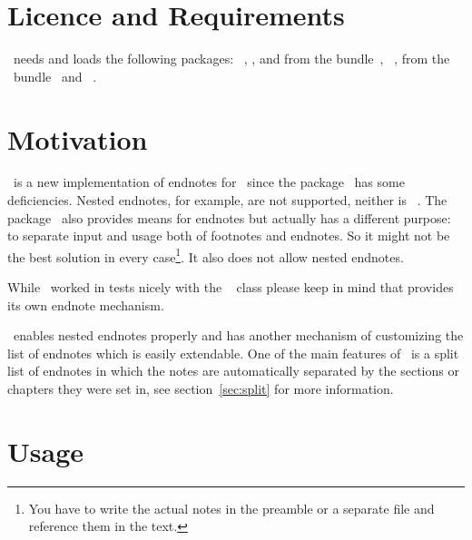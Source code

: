 \documentclass[load-preamble+]{cnltx-doc}
\begin{document}
\section{Licence and Requirements}
\license

\enotez\ needs and loads the following packages:
~\cite{bnd:l3kernel}, ,  and
 from the  bundle~\cite{bnd:l3packages},
~\cite{pkg:xpatch},  from the \KOMAScript\
bundle~\cite{bnd:koma-script} and ~\cite{pkg:translations}.

\section{Motivation}
\enotez\ is a new implementation of endnotes for \LaTeXe\ since the
\pkg{endnotes} package~\cite{pkg:endnotes} has some deficiencies.  Nested
endnotes, for example, are not supported, neither is
~\cite{pkg:hyperref}.  The 
package~\cite{pkg:sepfootnotes} also provides means for endnotes but actually
has a different purpose: to separate input and usage both of footnotes and
endnotes.  So it might not be the best solution in every case\footnote{You
  have to write the actual notes in the preamble or a separate file and
  reference them in the text.}.  It also does not allow nested endnotes.

While \enotez\ worked in tests nicely with the
~\cite{cls:memoir} class please keep in mind that
\cls{memoir} provides its own endnote mechanism.

\enotez\ enables nested endnotes properly and has another mechanism of
customizing the list of endnotes which is easily extendable.  One of the main
features of \enotez\ is a split list of endnotes in which the notes are
automatically separated by the sections or chapters they were set in, see
section~\ref{sec:split} for more information.

\section{Usage}
\end{document}
